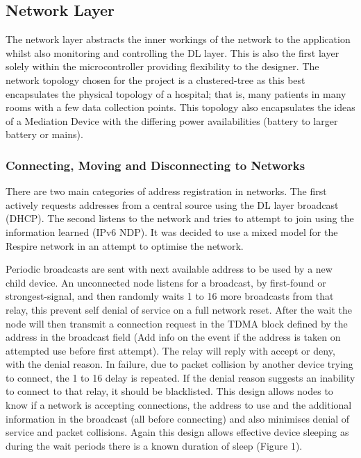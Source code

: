\subsection{Network Layer}
The network layer abstracts the inner workings of the network to the application whilst also
monitoring and controlling the DL layer. This is also the first layer solely within the microcontroller
providing flexibility to the designer.
The network topology chosen for the project is a clustered-tree as this best encapsulates the
physical topology of a hospital; that is, many patients in many rooms with a few data collection
points. This topology also encapsulates the ideas of a Mediation Device with the differing power
availabilities (battery to larger battery or mains)\cite{Cuomo, Della Luna, Cipollone, Todorova, & Suihko,
2008}.

\subsubsection{Connecting, Moving and Disconnecting to Networks}
There are two main categories of address registration in networks. The first actively requests
addresses from a central source using the DL layer broadcast (\eg DHCP). The second listens to the
network and tries to attempt to join using the information learned (\eg IPv6 NDP). It was decided to
use a mixed model for the Respire network in an attempt to optimise the network.


Periodic broadcasts are sent with next available address to be used by a new child device. An
unconnected node listens for a broadcast, by first-found or strongest-signal, and then randomly
waits 1 to 16 more broadcasts from that relay, this prevent self denial of service on a full network
reset. After the wait the node will then transmit a connection request in the TDMA block defined by
the address in the broadcast field (Add info on the event if the address is taken on attempted use
before first attempt). The relay will reply with accept or deny, with the denial reason. In failure, due
to packet collision by another device trying to connect, the 1 to 16 delay is repeated. If the denial
reason suggests an inability to connect to that relay, it should be blacklisted. This design allows
nodes to know if a network is accepting connections, the address to use and the additional
information in the broadcast (all before connecting) and also minimises denial of service and packet
collisions. Again this design allows effective device sleeping as during the wait periods there is a
known duration of sleep (Figure 1).


